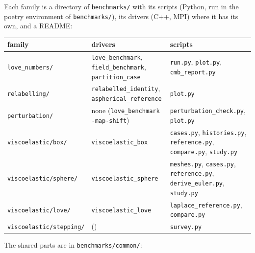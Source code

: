 \documentclass[11pt]{article}
\numberwithin{equation}{section}
\newcommand{\code}[1]{\texttt{#1}}
\begin{document}
Each family is a directory of \code{benchmarks/} with its scripts (Python,
run in the poetry environment of \code{benchmarks/}), its drivers (C++,
MPI) where it has its own, and a README:
\begin{center}
\small
\begin{tabular}{@{}lP{5.2cm}P{5.8cm}@{}}
\toprule
family & drivers & scripts \\
\midrule
\code{love\_numbers/} & \code{love\_benchmark}, \code{field\_benchmark}, \code{partition\_case} & \code{run.py}, \code{plot.py}, \code{cmb\_report.py} \\
\code{relabelling/} & \code{relabelled\_identity}, \code{aspherical\_reference} & \code{plot.py} \\
\code{perturbation/} & none (\code{love\_benchmark -map-shift}) & \code{perturbation\_check.py}, \code{plot.py} \\
\code{viscoelastic/box/} & \code{viscoelastic\_box} & \code{cases.py}, \code{histories.py}, \code{reference.py}, \code{compare.py}, \code{study.py} \\
\code{viscoelastic/sphere/} & \code{viscoelastic\_sphere} & \code{meshes.py}, \code{cases.py}, \code{reference.py}, \code{derive\_euler.py}, \code{study.py} \\
\code{viscoelastic/love/} & \code{viscoelastic\_love} & \code{laplace\_reference.py}, \code{compare.py} \\
\code{viscoelastic/stepping/} & () & \code{survey.py} \\
\bottomrule
\end{tabular}
\end{center}
The shared parts are in \code{benchmarks/common/}:
\end{document}
